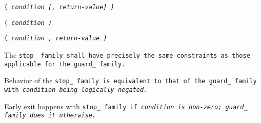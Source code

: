 
\s\s\s\tt{(} \it{condition} [\tt{,} \it{return-value}\opt] \tt{)}

\s\tt{(} \it{condition} \tt{)}

\s\tt{(} \it{condition} \phantom{[}\tt{,} \it{return-value}\opt\phantom{]} \tt{)}


The \tt{stop_} family shall have precisely the same
constraints as those applicable for the \tt{guard_} family.


Behavior of the \tt{stop_} family is equivalent to that of the
\tt{guard_} family with \it{condition} being logically negated.

\note Early exit happens with \tt{stop_} family if \it{condition}
is non-zero; \tt{guard_} family does it otherwise.
